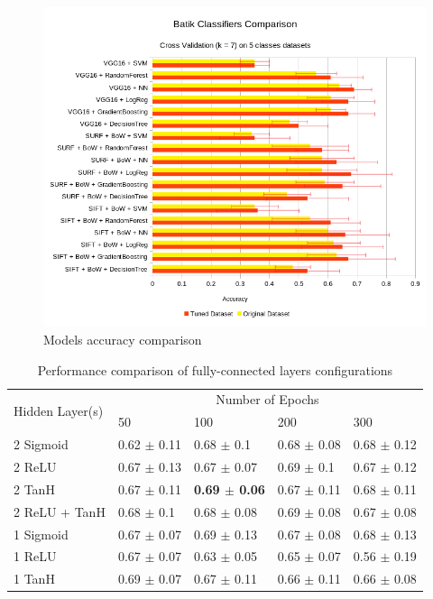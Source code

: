 \documentclass[conference, compsoc]{IEEEtran}
\begin{document}
\begin{figure}[h]
	\begin{center}
		\includegraphics[width=\textwidth]{../chart_accuracy_rev}
		\renewcommand{\figurename}{Fig.}
		\caption{Models accuracy comparison}
		\label{fig_accuracy_comparison}
	\end{center}
\end{figure}

\begin{table}
	\begin{center}
		\caption{Performance comparison of fully-connected layers configurations}
		\label{tab_experiment_results}	
		\begin{tabular}{lllll}
		    \toprule
			\multirow{2}{*}[-3pt]{Hidden Layer(s)}  & \multicolumn{4}{c}{Number of Epochs} \\ 
		    \cmidrule{2-5} 
		  & 50 & 100 & 200 & 300 \\ 
		     \midrule
2 Sigmoid & 0.62 $\pm$ 0.11 & 0.68 $\pm$ 0.1 & 0.68 $\pm$ 0.08 & 0.68 $\pm$ 0.12 \\
2 ReLU & 0.67 $\pm$ 0.13 & 0.67 $\pm$ 0.07 & 0.69 $\pm$ 0.1 & 0.67 $\pm$ 0.12 \\
2 TanH & 0.67 $\pm$ 0.11 & \textbf{0.69 $\pm$ 0.06} & 0.67 $\pm$ 0.11 & 0.68 $\pm$ 0.11 \\
2 ReLU + TanH & 0.68 $\pm$ 0.1 & 0.68 $\pm$ 0.08 & 0.69 $\pm$ 0.08 & 0.67 $\pm$ 0.08 \\
1 Sigmoid & 0.67 $\pm$ 0.07 & 0.69 $\pm$ 0.13 & 0.67 $\pm$ 0.08 & 0.68 $\pm$ 0.13 \\
1 ReLU  & 0.67 $\pm$ 0.07 & 0.63 $\pm$ 0.05 & 0.65 $\pm$ 0.07 & 0.56 $\pm$ 0.19 \\
1 TanH & 0.69 $\pm$ 0.07 & 0.67 $\pm$ 0.11 & 0.66 $\pm$ 0.11 & 0.66 $\pm$ 0.08 \\
		    \bottomrule
		\end{tabular}
	\end{center}
\end{table} 
\end{document}
